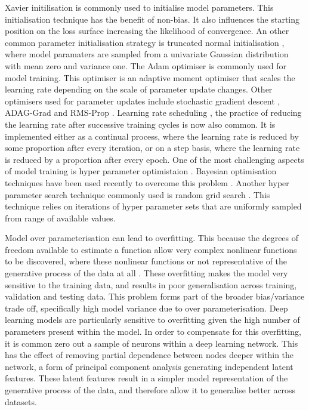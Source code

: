  Xavier initilisation \cite{reference} is commonly used to initialise model parameters. This initialisation technique has the benefit of non-bias. It also influences the starting position on the loss surface increasing the likelihood of convergence. An other common parameter initialisation strategy is truncated normal initialisation \cite{reference}, where model paramaters are sampled from a univariate Gaussian distribution with mean zero and variance one. \newline
The Adam \cite{reference} optimiser is commonly used for model training. This optimiser is an adaptive moment optimiser that scales the learning rate depending on the scale of parameter update changes. Other optimisers used for parameter updates include stochastic gradient descent \cite{reference}, ADAG-Grad \cite {reference} and RMS-Prop \cite{reference}. \newline
Learning rate scheduling \cite{reference}, the practice of reducing the learning rate after successive training cycles is now also common. It is implemented either as a continual process, where the learning rate is reduced by some proportion after every iteration, or on a step basis, where the learning rate is reduced by a proportion after every epoch. \newline
One of the most challenging aspects of model training is hyper parameter optimistaion \cite{reference}. Bayesian optimisation techniques have been used recently to overcome this problem \cite{reference}. Another hyper parameter search technique commonly used is random grid search \cite{reference}. This technique relies on iterations of hyper parameter sets that are uniformly sampled from range of available values. \newline

Model over parameterisation can lead to overfitting. This because the degrees of freedom available to estimate a function allow very complex nonlinear functions to be discovered, where these nonlinear functions or not representative of the generative process of the data at all \cite{reference}. These overfitting makes the model very sensitive to the training data, and results in poor generalisation across training, validation and testing data. This problem forms part of the broader bias/variance trade off, specifically high model variance due to over parameterisation. Deep learning models are particularly sensitive to overfitting given the high number of parameters present within the model. In order to compensate for this overfitting, it is common zero out a sample of neurons within a deep learning network. This has the effect of removing partial dependence between nodes deeper within the network, a form of principal component analysis generating independent latent features. These latent features result in a simpler model representation of the generative process of the data, and therefore allow it to generalise better across datasets. \newline

